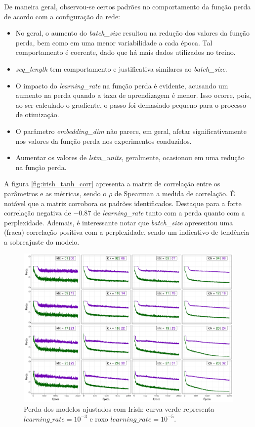 \documentclass[twoside]{automatextcc}
\begin{document}
De maneira geral, observou-se certos padrões no comportamento da função perda de acordo com a configuração da rede:
\begin{itemize}
    \item No geral, o aumento do \textit{batch\_size} resultou na redução dos valores da função perda, bem como em uma menor variabilidade a cada época. Tal comportamento é coerente, dado que há mais dados utilizados no treino.
    \item \textit{seq\_length} tem comportamento e justificativa similares ao \textit{batch\_size}.
    \item O impacto do \textit{learning\_rate} na função perda é evidente, acusando um aumento na perda quando a taxa de aprendizagem é menor. Isso ocorre, pois, ao ser calculado o gradiente, o passo foi demasiado pequeno para o processo de otimização. 
    \item O parâmetro \textit{embedding\_dim} não parece, em geral, afetar significativamente nos valores da função perda nos experimentos conduzidos.
    \item Aumentar os valores de \textit{lstm\_units}, geralmente, ocasionou em uma redução na função perda. 
\end{itemize}

A figura \ref{fig:irish_tanh_corr} apresenta a matriz de correlação entre os parâmetros e as métricas, sendo o $\rho$ de Spearman a medida de correlação. É notável que a matriz corrobora os padrões identificados. Destaque para a forte correlação negativa de $-0.87$ de \textit{learning\_rate} tanto com a perda quanto com a perplexidade. Ademais, é interessante notar que \textit{batch\_size} apresentou uma (fraca) correlação positiva com a perplexidade, sendo um indicativo de tendência a sobreajuste do modelo. 

\begin{figure}[!ht]
    \centering
    \includegraphics[width=\textwidth]{irish_tanh_loss.pdf}
    \caption{Perda dos modelos ajustados com Irish: curva verde representa $learning\_rate = 10^{-3}$ e roxo $learning\_rate = 10^{-5}$.}
    \label{fig:irish_tanh_loss}
\end{figure}
\end{document}
